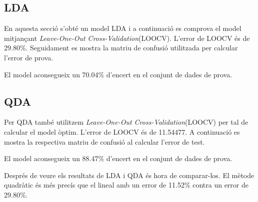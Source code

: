 \subsection{LDA}
En aquesta secció s'obté un model LDA i a continuació es comprova el model mitjançant \textit{Leave-One-Out Cross-Validation}(LOOCV). L'error de LOOCV és de 29.80\%. Seguidament es mostra la matriu de confusió utilitzada per calcular l'error de prova.

El model aconsegueix un 70.04\% d'encert en el conjunt de dades de prova.

\subsection{QDA}
Per QDA també utilitzem \textit{Leave-One-Out Cross-Validation}(LOOCV) per tal de calcular el model òptim. L'error de LOOCV és de 11.54477. A continuació es mostra la respectiva matriu de confusió al calcular l'error de test.



El model aconsegueix un 88.47\% d'encert en el conjunt de dades de prova.

Després de veure els resultats de LDA i QDA és hora de comparar-los. El mètode quadràtic és més precís que el lineal amb un error de 11.52\% contra un error de 29.80\%. 
